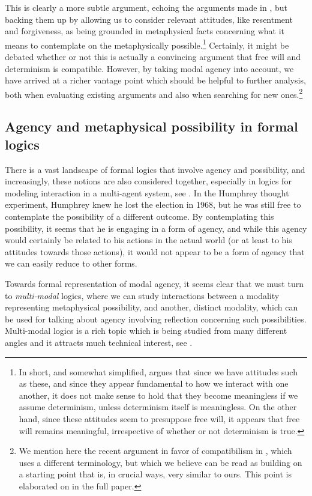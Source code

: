 \documentclass{article}
\begin{document}
This is clearly a more subtle argument, echoing the arguments made in \cite{strawsonfree}, but backing them up by allowing us to consider relevant attitudes, like resentment and forgiveness, as being grounded in metaphysical facts concerning what it means to contemplate on the metaphysically possible.\footnote{In short, and somewhat simplified, \cite{strawsonfree} argues that since we have attitudes such as these, and since they appear fundamental to how we interact with one another, it does not make sense to hold that they become meaningless if we assume determinism, unless determinism itself is meaningless. On the other hand, since these attitudes seem to presuppose free will, it appears that free will remains meaningful, irrespective of whether or not determinism is true.} Certainly, it might be debated whether or not this is actually a convincing argument that free will and determinism is compatible. However, by taking modal agency into account, we have arrived at a richer vantage point which should be 
helpful to further analysis, both when evaluating existing arguments and also when searching for new ones.\footnote{We mention here the recent argument in favor of compatibilism in \cite{Listfree}, which uses a different terminology, but which we believe can be read as building on a starting point that is, in crucial ways, very similar to ours. This point is elaborated on in the full paper.}

\subsection*{Agency and metaphysical possibility in formal logics}

There is a vast landscape of formal logics that involve agency and possibility, and increasingly, these notions are also considered together, especially in logics for modeling interaction in a multi-agent system, see \cite{IMAS,Benthem}. In the Humphrey thought experiment, Humphrey knew he lost the election in 1968, but he was still free to contemplate the possibility of a different outcome. By contemplating this possibility, it seems that he is engaging in a form of agency, and while this agency would certainly be related to his actions in the actual world (or at least to his attitudes towards those actions), it would not appear to be a form of agency that we can easily reduce to other forms.

Towards formal representation of modal agency, it seems clear that we must turn to \emph{multi-modal} logics, where we can study interactions between a modality representing metaphysical possibility, and another, distinct modality, which can be used for talking about agency involving reflection concerning such possibilities. Multi-modal logics is a rich topic which is being studied from many different angles and it attracts much technical interest, see \cite{multimod}. 
\end{document}

